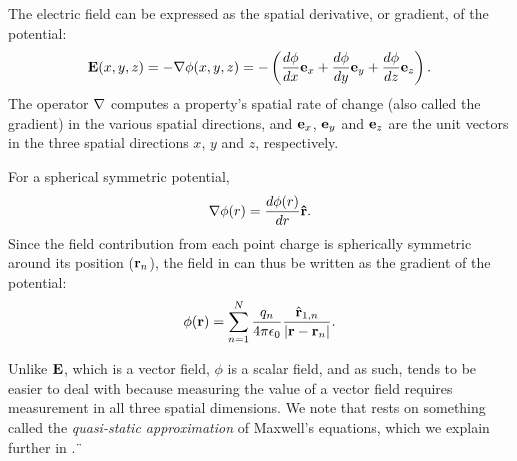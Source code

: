The electric field can be expressed as the spatial derivative, or gradient, of the potential:
\begin{equation}
{\bf E}(x,y,z) = - {\bf \nabla} \phi(x,y,z) = - \left(\frac{d\phi}{dx} {\bf e}_x  + \frac{d\phi}{dy} {\bf e}_y + \frac{d\phi}{dz} {\bf e}_z \right).
\label{eq:Basics:EV}
\end{equation}
The operator ${\bf \nabla}$ computes a property's spatial rate of change (also called the gradient) in the various spatial directions, and ${\bf e}_x$, ${\bf e}_y$ and  ${\bf e}_z$ are the unit vectors in the three spatial directions $x$, $y$ and $z$, respectively.

For a spherical symmetric potential,
\begin{equation}
{\bf \nabla} \phi(r) = \frac{d\phi(r)}{dr} {\bf \hat{r}}.
\label{eq:Basics:SphericalNablaPhi}
\end{equation}
Since the field contribution from each point charge is spherically symmetric around its position (${\bf r}_n$), the field in  can thus be written as the gradient of the potential:
\begin{equation}
{\phi}({\bf r}) = \sum_{n=1}^{N}  \frac{q_n}{4\pi \epsilon_0} \frac{\hat{{\bf r}}_{1,n}}{|{\bf r}-{\bf r}_n|}.
\label{eq:Basics:CoulombPhiN}
\end{equation}

Unlike ${\bf E}$, which is a vector field, $\phi$ is a scalar field, and as such, tends to be easier to deal with because measuring the value of a vector field requires measurement in all three spatial dimensions. We note that  rests on something called the \textit{quasi-static approximation} of Maxwell's equations, which we explain further in .¨

 


